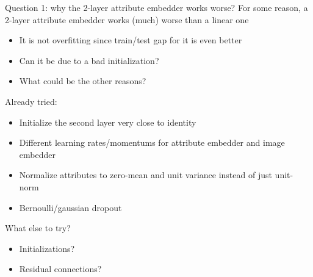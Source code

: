 \documentclass[10pt]{beamer}
\begin{document}
\begin{frame}{Question 1: why the 2-layer attribute embedder works worse?}
For some reason, a 2-layer attribute embedder works (much) worse than a linear one
\begin{itemize}
    \item\pause It is not overfitting since train/test gap for it is even better
    \item\pause Can it be due to a bad initialization?
    \item\pause What could be the other reasons?
\end{itemize}

Already tried:
\begin{itemize}
    \item\pause Initialize the second layer very close to identity
    \item\pause Different learning rates/momentums for attribute embedder and image embedder
    \item\pause Normalize attributes to zero-mean and unit variance instead of just unit-norm
    \item\pause Bernoulli/gaussian dropout
\end{itemize}

\pause
What else to try?
\begin{itemize}
    \item Initializations?
    \item Residual connections?
\end{itemize}
\end{frame}
\end{document}
